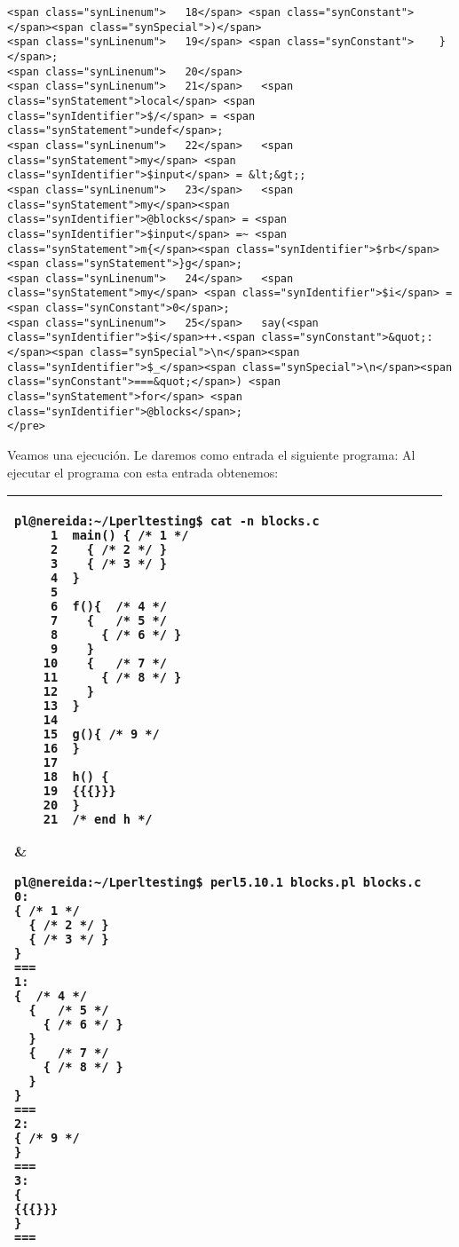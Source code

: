 \begin{verbatim}
<span class="synLinenum">   18</span> <span class="synConstant">      </span><span class="synSpecial">)</span>
<span class="synLinenum">   19</span> <span class="synConstant">    }</span>;
<span class="synLinenum">   20</span>   
<span class="synLinenum">   21</span>   <span class="synStatement">local</span> <span class="synIdentifier">$/</span> = <span class="synStatement">undef</span>;
<span class="synLinenum">   22</span>   <span class="synStatement">my</span> <span class="synIdentifier">$input</span> = &lt;&gt;;
<span class="synLinenum">   23</span>   <span class="synStatement">my</span><span class="synIdentifier">@blocks</span> = <span class="synIdentifier">$input</span> =~ <span class="synStatement">m{</span><span class="synIdentifier">$rb</span><span class="synStatement">}g</span>;
<span class="synLinenum">   24</span>   <span class="synStatement">my</span> <span class="synIdentifier">$i</span> = <span class="synConstant">0</span>;
<span class="synLinenum">   25</span>   say(<span class="synIdentifier">$i</span>++.<span class="synConstant">&quot;:</span><span class="synSpecial">\n</span><span class="synIdentifier">$_</span><span class="synSpecial">\n</span><span class="synConstant">===&quot;</span>) <span class="synStatement">for</span> <span class="synIdentifier">@blocks</span>;
</pre>

\end{verbatim}

Veamos una ejecución. Le daremos como entrada el siguiente programa:
Al ejecutar el programa con esta entrada obtenemos:

\begin{tabular}{|p{8cm}|p{8cm}|}
\hline
\begin{verbatim}
pl@nereida:~/Lperltesting$ cat -n blocks.c
     1  main() { /* 1 */
     2    { /* 2 */ }
     3    { /* 3 */ }
     4  }
     5
     6  f(){  /* 4 */
     7    {   /* 5 */
     8      { /* 6 */ }
     9    }
    10    {   /* 7 */
    11      { /* 8 */ }
    12    }
    13  }
    14
    15  g(){ /* 9 */
    16  }
    17
    18  h() {
    19  {{{}}}
    20  }
    21  /* end h */
\end{verbatim}
&
\begin{verbatim}
pl@nereida:~/Lperltesting$ perl5.10.1 blocks.pl blocks.c
0:
{ /* 1 */
  { /* 2 */ }
  { /* 3 */ }
}
===
1:
{  /* 4 */
  {   /* 5 */
    { /* 6 */ }
  }
  {   /* 7 */
    { /* 8 */ }
  }
}
===
2:
{ /* 9 */
}
===
3:
{
{{{}}}
}
===
\end{verbatim}
\\
\hline
\end{tabular}

